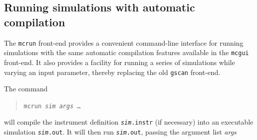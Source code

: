 \subsection{Running simulations with automatic compilation}
\label{s:mcrun}

The \verb+mcrun+ front-end provides a convenient command-line
interface for running simulations with the same automatic compilation
features available in the \verb+mcgui+ front-end. It also provides a
facility for running a series of simulations while varying an input
parameter, thereby replacing the old \verb+gscan+ front-end.

The command
\begin{quote}
  \texttt{mcrun {\it sim} {\it args\/} \ldots}
\end{quote}
will compile the instrument definition \texttt{{\it sim}.instr} (if
necessary) into an executable simulation \texttt{{\it sim}.out}. It
will then run \texttt{{\it sim}.out}, passing the argument list {\it
  args}

